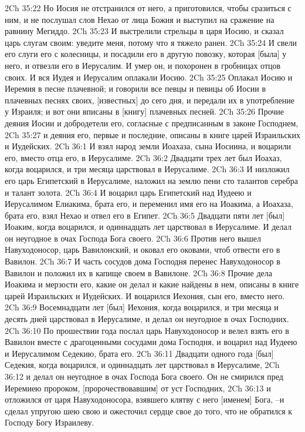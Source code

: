2Ch 35:22  Но Иосия не отстранился от него, а приготовился, чтобы сразиться с ним, и не послушал слов Нехао от лица Божия и выступил на сражение на равнину Мегиддо.
2Ch 35:23  И выстрелили стрельцы в царя Иосию, и сказал царь слугам своим: уведите меня, потому что я тяжело ранен.
2Ch 35:24  И свели его слуги его с колесницы, и посадили его в другую повозку, которая [была] у него, и отвезли его в Иерусалим. И умер он, и похоронен в гробницах отцов своих. И вся Иудея и Иерусалим оплакали Иосию.
2Ch 35:25  Оплакал Иосию и Иеремия в песне плачевной; и говорили все певцы и певицы об Иосии в плачевных песнях своих, [известных] до сего дня, и передали их в употребление у Израиля; и вот они вписаны в [книгу] плачевных песней.
2Ch 35:26  Прочие деяния Иосии и добродетели его, согласные с предписанным в законе Господнем,
2Ch 35:27  и деяния его, первые и последние, описаны в книге царей Израильских и Иудейских.
2Ch 36:1  И взял народ земли Иоахаза, сына Иосиина, и воцарили его, вместо отца его, в Иерусалиме.
2Ch 36:2  Двадцати трех лет был Иоахаз, когда воцарился, и три месяца царствовал в Иерусалиме.
2Ch 36:3  И низложил его царь Египетский в Иерусалиме, наложил на землю пени сто талантов серебра и талант золота.
2Ch 36:4  И воцарил царь Египетский над Иудеею и Иерусалимом Елиакима, брата его, и переменил имя его на Иоакима, а Иоахаза, брата его, взял Нехао и отвел его в Египет.
2Ch 36:5  Двадцати пяти лет [был] Иоаким, когда воцарился, и одиннадцать лет царствовал в Иерусалиме. И делал он неугодное в очах Господа Бога своего.
2Ch 36:6  Против него вышел Навуходоносор, царь Вавилонский, и оковал его оковами, чтоб отвести его в Вавилон.
2Ch 36:7  И часть сосудов дома Господня перенес Навуходоносор в Вавилон и положил их в капище своем в Вавилоне.
2Ch 36:8  Прочие дела Иоакима и мерзости его, какие он делал и какие найдены в нем, описаны в книге царей Израильских и Иудейских. И воцарился Иехония, сын его, вместо него.
2Ch 36:9  Восемнадцати лет [был] Иехония, когда воцарился, и три месяца и десять дней царствовал в Иерусалиме, и делал он неугодное в очах Господних.
2Ch 36:10  По прошествии года послал царь Навуходоносор и велел взять его в Вавилон вместе с драгоценными сосудами дома Господня, и воцарил над Иудеею и Иерусалимом Седекию, брата его.
2Ch 36:11  Двадцати одного года [был] Седекия, когда воцарился, и одиннадцать лет царствовал в Иерусалиме,
2Ch 36:12  и делал он неугодное в очах Господа Бога своего. Он не смирился пред Иеремиею пророком, [пророчествовавшим] от уст Господних,
2Ch 36:13  и отложился от царя Навуходоносора, взявшего клятву с него [именем] Бога, --и сделал упругою шею свою и ожесточил сердце свое до того, что не обратился к Господу Богу Израилеву.

